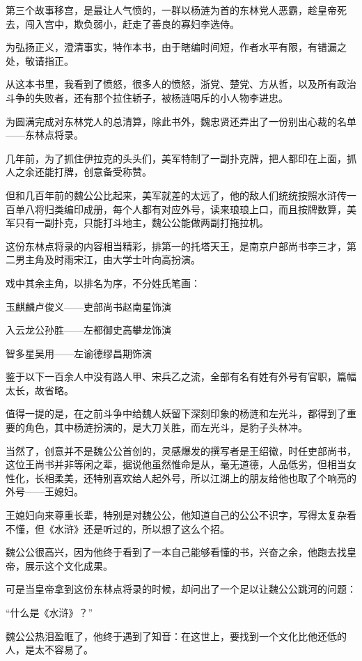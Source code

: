 \begin{multicols}{\theparacolNo}
		第三个故事移宫，是最让人气愤的，一群以杨涟为首的东林党人恶霸，趁皇帝死去，闯入宫中，欺负弱小，赶走了善良的寡妇李选侍。

		为弘扬正义，澄清事实，特作本书，由于瞎编时间短，作者水平有限，有错漏之处，敬请指正。

		从这本书里，我看到了愤怒，很多人的愤怒，浙党、楚党、方从哲，以及所有政治斗争的失败者，还有那个拉住轿子，被杨涟喝斥的小人物李进忠。

		为圆满完成对东林党人的总清算，除此书外，魏忠贤还弄出了一份别出心裁的名单——东林点将录。

		几年前，为了抓住伊拉克的头头们，美军特制了一副扑克牌，把人都印在上面，抓人之余还能打牌，创意备受称赞。

		但和几百年前的魏公公比起来，美军就差的太远了，他的敌人们统统按照水浒传一百单八将归类编印成册，每个人都有对应外号，读来琅琅上口，而且按牌数算，美军只有一副扑克，只能打斗地主，魏公公能做两副打拖拉机。

		这份东林点将录的内容相当精彩，排第一的托塔天王，是南京户部尚书李三才，第二男主角及时雨宋江，由大学士叶向高扮演。

		戏中其余主角，以排名为序，不分姓氏笔画：

		玉麒麟卢俊义——吏部尚书赵南星饰演

		入云龙公孙胜——左都御史高攀龙饰演

		智多星吴用——左谕德缪昌期饰演

		鉴于以下一百余人中没有路人甲、宋兵乙之流，全部有名有姓有外号有官职，篇幅太长，故省略。

		值得一提的是，在之前斗争中给魏人妖留下深刻印象的杨涟和左光斗，都得到了重要的角色，其中杨涟扮演的，是大刀关胜，而左光斗，是豹子头林冲。

		当然了，创意并不是魏公公首创的，灵感爆发的撰写者是王绍徽，时任吏部尚书，这位王尚书并非等闲之辈，据说他虽然惟命是从，毫无道德，人品低劣，但相当女性化，长相柔美，还特别喜欢给人起外号，所以江湖上的朋友给他也取了个响亮的外号——王媳妇。

		王媳妇向来尊重长辈，特别是对魏公公，他知道自己的公公不识字，写得太复杂看不懂，但《水浒》还是听过的，所以想了这么个招。

		魏公公很高兴，因为他终于看到了一本自己能够看懂的书，兴奋之余，他跑去找皇帝，展示这个文化成果。

		可是当皇帝拿到这份东林点将录的时候，却问出了一个足以让魏公公跳河的问题：

		“什么是《水浒》？”

		魏公公热泪盈眶了，他终于遇到了知音：在这世上，要找到一个文化比他还低的人，是太不容易了。


\end{multicols}
